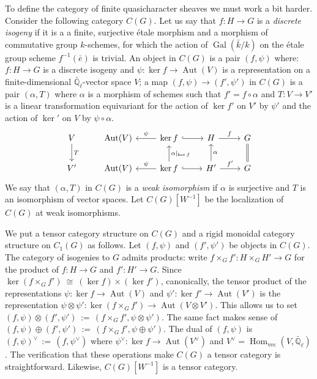 \documentclass[11pt]{amsart}
\theoremstyle{plain}
\theoremstyle{definition}
\theoremstyle{remark}
\newcommand{\EE}{\mathbb{\bar Q}_\ell}
\newcommand{\bFq}{\bar{k}}
\newcommand{\Fq}{k}
\DeclareMathOperator{\Gal}{Gal}
\DeclareMathOperator{\Aut}{Aut}
\DeclareMathOperator{\Hom}{Hom}
\newcommand{\cdef}[1]{ {#1}\index{#1} }
\newcommand{\ceq}{{\, :=\, }}
\newcommand{\iso}{{\ \cong\ }}
\begin{document}
To define the category of finite quasicharacter sheaves we must work a bit harder.
Consider the following category $C(G)$.
Let us say that $f : H\to G$ is a \emph{discrete isogeny} if it is a a finite, surjective
\'etale morphism and a morphism of commutative group $\Fq$-schemes, for which
the action of $\Gal(\bFq/\Fq)$ on the \'etale group scheme $f^{-1}({\bar e})$ is trivial.
An object in $C(G)$ is a pair $(f,\psi)$ where: 
$f : H\to G$ is a discrete isogeny 
and $\psi : \ker f\to \Aut(V)$ is a representation on a finite-dimensional $\EE$-vector space $V$;
a map $(f,\psi) \to (f',\psi')$ in $C(G)$ is a pair $(\alpha,T)$ 
where $\alpha$ is a morphism of schemes such that $f' = f\circ \alpha$
and $T : V\to V'$ is a linear transformation equivariant 
for the action of $\ker f'$ on $V'$ by $\psi'$ 
and the action of $\ker '$ on $V$ by $\psi \circ \alpha$.
\[
\begin{tikzcd}
V \arrow{d}{T} & \Aut(V) & \arrow[swap]{l}{\psi} \ker f \arrow[hook]{r} & H \arrow{r}{f} & \arrow[equal]{d} G\\
V' & \Aut(V) & \arrow[swap]{l}{\psi} \arrow[swap]{u}{\alpha\vert_{\ker f}} \ker f \arrow[hook]{r} & \arrow[swap]{u}{\alpha} H' \arrow{r}{f'} & G
\end{tikzcd}
\]
We say that $(\alpha,T)$ in $C(G)$ is a \emph{weak isomorphism} if $\alpha$ is surjective
and $T$ is an isomorphism of vector spaces.
Let \cdef{$C(G)[W^{-1}]$} be the localization of $C(G)$ at weak isomorphisms.

We put a tensor category structure on $C(G)$ 
and a rigid monoidal category structure on $C_1(G)$ as follows.
Let $(f,\psi)$ and $(f',\psi')$ be objects in $C(G)$. 
The category of isogenies to $G$ admits products: 
write $f\times_G f' : H\times_G H' \to G$ for the product of $f : H\to G$ and $f' : H'\to G$. 
Since $\ker(f\times_G f') \iso (\ker f)\times (\ker f')$, canonically,
the tensor product of the representations $\psi : \ker f\to \Aut(V)$ and $\psi' : \ker f'\to \Aut(V')$ 
is the representation $\psi \otimes\psi' :  \ker(f\times_G f') \to \Aut(V\otimes V')$. 
This allows us to set $(f,\psi)\otimes(f',\psi') \ceq (f\times_G f' ,\psi\otimes\psi')$. 
The same fact makes sense of $(f,\psi)\oplus(f',\psi')\ceq (f\times_G f' ,\psi\oplus\psi')$. 
The dual of $(f,\psi)$ is $(f,\psi)^\vee \ceq (f,\psi^\vee)$ 
where $\psi^\vee : \ker f \to \Aut(V^\vee)$ and $V^\vee = \Hom_\text{vec}(V,\EE)$. 
The verification that these operations make $C(G)$ a tensor category is straightforward.
Likewise, $C(G)[W^{-1}]$ is a tensor category.
\end{document}
